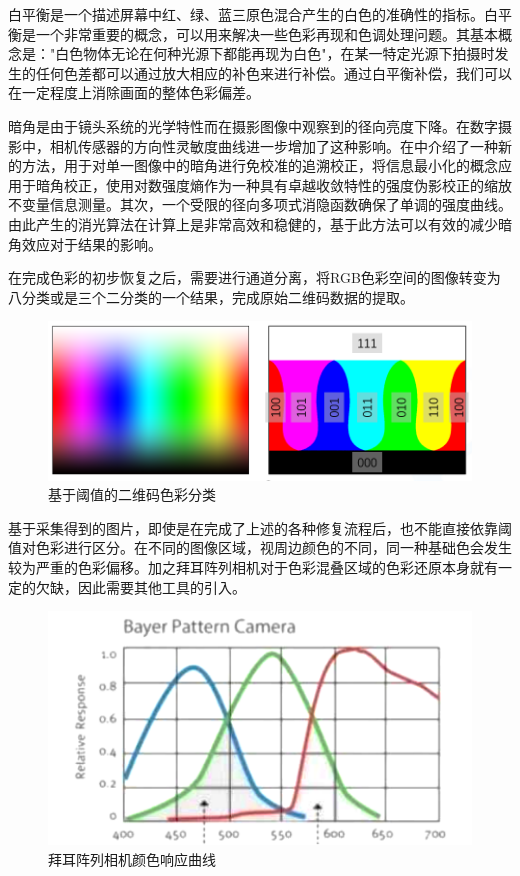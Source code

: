 白平衡是一个描述屏幕中红、绿、蓝三原色混合产生的白色的准确性的指标。白平衡是一个非常重要的概念，可以用来解决一些色彩再现和色调处理问题。其基本概念是："白色物体无论在何种光源下都能再现为白色"，在某一特定光源下拍摄时发生的任何色差都可以通过放大相应的补色来进行补偿。通过白平衡补偿，我们可以在一定程度上消除画面的整体色彩偏差。\cite{陈申渭2019摄屏类图像重构算法}

暗角是由于镜头系统的光学特性而在摄影图像中观察到的径向亮度下降。在数字摄影中，相机传感器的方向性灵敏度曲线进一步增加了这种影响。在\cite{zheng2008single,lopez2015revisiting}中介绍了一种新的方法，用于对单一图像中的暗角进行免校准的追溯校正，将信息最小化的概念应用于暗角校正，使用对数强度熵作为一种具有卓越收敛特性的强度伪影校正的缩放不变量信息测量。其次，一个受限的径向多项式消隐函数确保了单调的强度曲线。由此产生的消光算法在计算上是非常高效和稳健的，基于此方法可以有效的减少暗角效应对于结果的影响。

在完成色彩的初步恢复之后，需要进行通道分离，将RGB色彩空间的图像转变为八分类或是三个二分类的一个结果，完成原始二维码数据的提取。

\begin{figure}[!htbp]
\centering
\includegraphics[scale=0.5]{figures/Color_Sp.png}
\caption{基于阈值的二维码色彩分类}
\end{figure}

基于采集得到的图片，即使是在完成了上述的各种修复流程后，也不能直接依靠阈值对色彩进行区分。在不同的图像区域，视周边颜色的不同，同一种基础色会发生较为严重的色彩偏移。加之拜耳阵列相机对于色彩混叠区域的色彩还原本身就有一定的欠缺，因此需要其他工具的引入。

\begin{figure}[!htbp]
\centering
\includegraphics[scale=0.8]{figures/Color_Ba.png}
\caption{拜耳阵列相机颜色响应曲线}
\end{figure}

